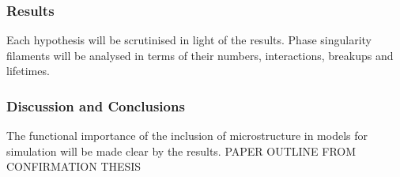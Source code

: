 \subsubsection{Results}
Each hypothesis will be scrutinised in light of the results. Phase singularity filaments will be analysed in terms of their numbers, interactions, breakups and lifetimes.

\subsubsection{Discussion and Conclusions}
The functional importance of the inclusion of microstructure in models for simulation will be made clear by the results.
PAPER OUTLINE FROM CONFIRMATION THESIS
